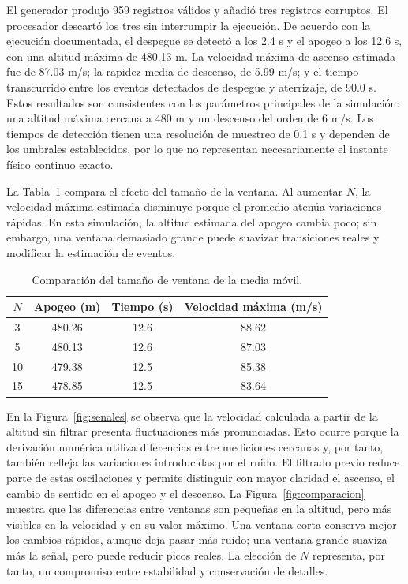 \documentclass[9pt,a4paper]{extarticle}
\begin{document}
El generador produjo 959 registros válidos y añadió tres registros corruptos. El procesador descartó los tres sin interrumpir la ejecución. De acuerdo con la ejecución documentada, el despegue se detectó a los 2.4 s y el apogeo a los 12.6 s, con una altitud máxima de 480.13 m. La velocidad máxima de ascenso estimada fue de 87.03 m/s; la rapidez media de descenso, de 5.99 m/s; y el tiempo transcurrido entre los eventos detectados de despegue y aterrizaje, de 90.0 s. Estos resultados son consistentes con los parámetros principales de la simulación: una altitud máxima cercana a 480 m y un descenso del orden de 6 m/s. Los tiempos de detección tienen una resolución de muestreo de 0.1 s y dependen de los umbrales establecidos, por lo que no representan necesariamente el instante físico continuo exacto.

La Tabla~\ref{tab:ventanas} compara el efecto del tamaño de la ventana. Al aumentar \(N\), la velocidad máxima estimada disminuye porque el promedio atenúa variaciones rápidas. En esta simulación, la altitud estimada del apogeo cambia poco; sin embargo, una ventana demasiado grande puede suavizar transiciones reales y modificar la estimación de eventos.

\begin{table}[H]
\centering
\caption{Comparación del tamaño de ventana de la media móvil.}
\label{tab:ventanas}
\begin{tabular}{cccc}
\toprule
\(N\) & Apogeo (m) & Tiempo (s) & Velocidad máxima (m/s)\\
\midrule
3  & 480.26 & 12.6 & 88.62\\
5  & 480.13 & 12.6 & 87.03\\
10 & 479.38 & 12.5 & 85.38\\
15 & 478.85 & 12.5 & 83.64\\
\bottomrule
\end{tabular}
\end{table}

En la Figura~\ref{fig:senales} se observa que la velocidad calculada a partir de la altitud sin filtrar presenta fluctuaciones más pronunciadas. Esto ocurre porque la derivación numérica utiliza diferencias entre mediciones cercanas y, por tanto, también refleja las variaciones introducidas por el ruido. El filtrado previo reduce parte de estas oscilaciones y permite distinguir con mayor claridad el ascenso, el cambio de sentido en el apogeo y el descenso. La Figura~\ref{fig:comparacion} muestra que las diferencias entre ventanas son pequeñas en la altitud, pero más visibles en la velocidad y en su valor máximo. Una ventana corta conserva mejor los cambios rápidos, aunque deja pasar más ruido; una ventana grande suaviza más la señal, pero puede reducir picos reales. La elección de \(N\) representa, por tanto, un compromiso entre estabilidad y conservación de detalles.
\end{document}
